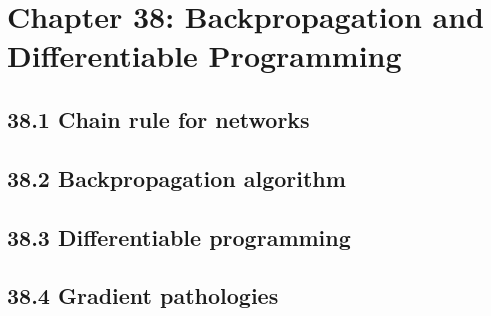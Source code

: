 \section{Chapter 38: Backpropagation and Differentiable Programming}

\subsection{38.1 Chain rule for networks}

\subsection{38.2 Backpropagation algorithm}

\subsection{38.3 Differentiable programming}

\subsection{38.4 Gradient pathologies}

\clearpage
